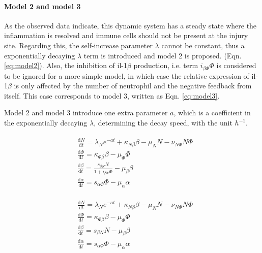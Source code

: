 \paragraph{Model 2 and model 3}

As the observed data indicate, this dynamic system has a steady state where the  inflammation is resolved and immune cells should not be present at the injury site. Regarding this, the self-increase parameter $\lambda$ cannot be constant, thus a exponentially decaying $\lambda$ term is introduced and model 2 is proposed. (Eqn. \ref{eq:model2}). Also, the inhibition of il-1$\beta$ production, i.e. term $i_{\beta\Phi}\Phi$ is considered to be ignored for a more simple model, in which case the relative expression of il-1$\beta$ is only affected by the number of neutrophil and the negative feedback from itself. This case corresponds to model 3, written as Eqn. \ref{eq:model3}.

Model 2 and model 3 introduce one extra parameter $a$, which is a coefficient in the exponentially decaying $\lambda$, determining the decay speed, with the unit $h^{-1}$.

\begin{align}
    \label{eq:model2}
    \begin{split}
        &\frac{\mathrm{d} N}{\mathrm{d} t}=\lambda_Ne^{-at}+\kappa_{N\beta}\beta-\mu_NN-\nu_{N\Phi}N\Phi\\
        &\frac{\mathrm{d} \Phi}{\mathrm{d} t}=\kappa_{\Phi\beta}\beta-\mu_\Phi\Phi\\
        &\frac{\mathrm{d} \beta}{\mathrm{d} t}=\frac{s_{\beta N}N}{1+i_{\beta\Phi}\Phi}-\mu_\beta\beta\\
        &\frac{\mathrm{d} \alpha}{\mathrm{d} t}=s_{\alpha\Phi}\Phi-\mu_\alpha\alpha
    \end{split}
\end{align}

\begin{align}
    \label{eq:model3}
    \begin{split}
        &\frac{\mathrm{d} N}{\mathrm{d} t}=\lambda_Ne^{-at}+\kappa_{N\beta}\beta-\mu_NN-\nu_{N\Phi}N\Phi\\
        &\frac{\mathrm{d} \Phi}{\mathrm{d} t}=\kappa_{\Phi\beta}\beta-\mu_\Phi\Phi\\
        &\frac{\mathrm{d} \beta}{\mathrm{d} t}=s_{\beta N}N-\mu_\beta\beta\\
        &\frac{\mathrm{d} \alpha}{\mathrm{d} t}=s_{\alpha\Phi}\Phi-\mu_\alpha\alpha
    \end{split}
\end{align}

